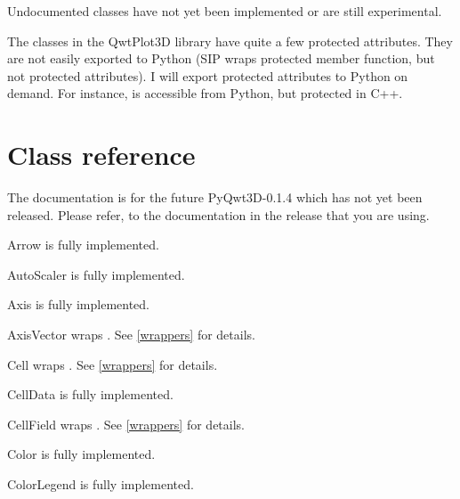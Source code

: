 \documentclass{manual}
\newcommand{\Future}{
  \begin{notice}[warning]
    The documentation is for the future PyQwt3D-0.1.4 which has not yet been
    released.  Please refer, to the documentation in the release that you are
    using.
  \end{notice}
}
\begin{document}
Undocumented classes have not yet been implemented or are still experimental.

The classes in the QwtPlot3D library have quite a few protected attributes.
They are not easily exported to Python (SIP wraps protected member function,
but not protected attributes).
I will export protected attributes to Python on demand. For instance,
 is accessible from Python, but protected in C++.




\section{Class reference \label{classes}}

\Future{}

\begin{classdesc*}{Arrow}
  is fully implemented.
\end{classdesc*}

\begin{classdesc*}{AutoScaler}
  is fully implemented.
\end{classdesc*}

\begin{classdesc*}{Axis}
  is fully implemented.
\end{classdesc*}

\begin{classdesc*}{AxisVector}
  wraps . See \ref{wrappers} for details.
\end{classdesc*}

\begin{classdesc*}{Cell}
  wraps . See \ref{wrappers} for details.
\end{classdesc*}

\begin{classdesc*}{CellData}
  is fully implemented.
\end{classdesc*}

\begin{classdesc*}{CellField}
  wraps . See \ref{wrappers} for details.
\end{classdesc*}

\begin{classdesc*}{Color}
  is fully implemented.
\end{classdesc*}

\begin{classdesc*}{ColorLegend}
  is fully implemented.
\end{classdesc*}
\end{document}
